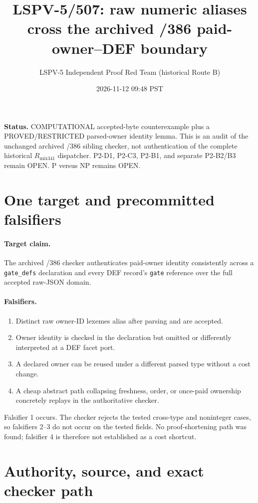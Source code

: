 \documentclass[11pt]{article}
\title{LSPV-5/507: raw numeric aliases cross the archived /386 paid-owner--DEF boundary}
\author{LSPV-5 Independent Proof Red Team (historical Route B)}
\date{2026-11-12 09:48 PST}
\begin{document}
\maketitle

\noindent\textbf{Status.} COMPUTATIONAL accepted-byte counterexample plus a
PROVED/RESTRICTED parsed-owner identity lemma.  This is an audit of the unchanged
archived /386 sibling checker, not authentication of the complete historical
$R_{\mathrm{mix341}}$ dispatcher.  P2-D1, P2-C3, P2-B1, and separate P2-B2/B3
remain OPEN.  P versus NP remains OPEN.

\section{One target and precommitted falsifiers}

\paragraph{Target claim.} The archived /386 checker authenticates paid-owner
identity consistently across a \texttt{gate\_defs} declaration and every DEF
record's \texttt{gate} reference over the full accepted raw-JSON domain.

\paragraph{Falsifiers.}
\begin{enumerate}
\item Distinct raw owner-ID lexemes alias after parsing and are accepted.
\item Owner identity is checked in the declaration but omitted or differently
interpreted at a DEF facet port.
\item A declared owner can be reused under a different parsed type without a cost change.
\item A cheap abstract path collapsing freshness, order, or once-paid ownership
concretely replays in the authoritative checker.
\end{enumerate}

Falsifier 1 occurs.  The checker rejects the tested cross-type and noninteger
cases, so falsifiers 2--3 do not occur on the tested fields.  No proof-shortening
path was found; falsifier 4 is therefore not established as a cost shortcut.

\section{Authority, source, and exact checker path}
\end{document}
